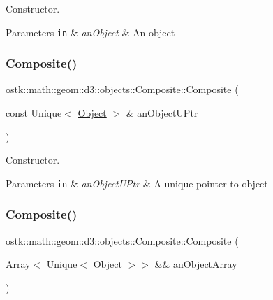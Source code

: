 Constructor. 


\begin{DoxyParams}[1]{Parameters}
\mbox{\tt in}  & {\em an\+Object} & An object \\
\hline
\end{DoxyParams}
\mbox{\label{classostk_1_1math_1_1geom_1_1d3_1_1objects_1_1_composite_a28d3ff898cd4385abf0fd73ddcb54ef2}} 
\subsubsection{\texorpdfstring{Composite()}{Composite()}\hspace{0.1cm}{\footnotesize\ttfamily [2/4]}}
{\footnotesize\ttfamily ostk\+::math\+::geom\+::d3\+::objects\+::\+Composite\+::\+Composite (\begin{DoxyParamCaption}\item[{const Unique$<$ \hyperlink{classostk_1_1math_1_1geom_1_1d3_1_1_object}{Object} $>$ \&}]{an\+Object\+U\+Ptr }\end{DoxyParamCaption})\hspace{0.3cm}{\ttfamily [explicit]}}



Constructor. 


\begin{DoxyParams}[1]{Parameters}
\mbox{\tt in}  & {\em an\+Object\+U\+Ptr} & A unique pointer to object \\
\hline
\end{DoxyParams}
\mbox{\label{classostk_1_1math_1_1geom_1_1d3_1_1objects_1_1_composite_a936bd3f9d4a6ba02b91ba47c61361b21}} 
\subsubsection{\texorpdfstring{Composite()}{Composite()}\hspace{0.1cm}{\footnotesize\ttfamily [3/4]}}
{\footnotesize\ttfamily ostk\+::math\+::geom\+::d3\+::objects\+::\+Composite\+::\+Composite (\begin{DoxyParamCaption}\item[{Array$<$ Unique$<$ \hyperlink{classostk_1_1math_1_1geom_1_1d3_1_1_object}{Object} $>$$>$ \&\&}]{an\+Object\+Array }\end{DoxyParamCaption})\hspace{0.3cm}{\ttfamily [explicit]}}



